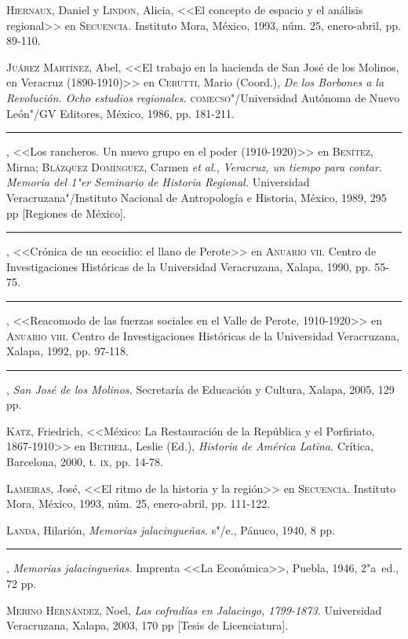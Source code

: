 \documentclass[14pt,twoside,final]{extbook} %
\begin{document}
\textsc{Hiernaux}, Daniel y \textsc{Lindon}, Alicia, <<El concepto de espacio y el análisis regional>> en \textsc{Secuencia}. Instituto Mora, México, 1993, núm. 25, enero-abril, pp. 89-110.

\textsc{Juárez Martínez}, Abel, <<El trabajo en la hacienda de San José de los Molinos, en Veracruz (1890-1910)>> en \textsc{Cerutti}, Mario (Coord.), \emph{De los Borbones a la
Revolución. Ocho estudios regionales.} \textsc{comecso}"/Universidad Autónoma de Nuevo León"/GV Editores, México, 1986, pp. 181-211.

\rule{1cm}{0.4pt}, <<Los rancheros. Un nuevo grupo en el poder (1910-1920)>> en \textsc{Benítez}, Mirna; \textsc{Blázquez Domínguez}, Carmen \emph{et al.}, \emph{Veracruz, un tiempo para contar. Memoria del 1"er Seminario de Historia Regional.} Universidad Veracruzana"/Instituto Nacional de Antropología e Historia, México, 1989, 295 pp [Regiones de México].

\rule{1cm}{0.4pt}, <<Crónica de un ecocidio: el llano de Perote>> en \textsc{Anuario vii}. Centro de Investigaciones Históricas de la Universidad Veracruzana, Xalapa, 1990, pp. 55-75.

\rule{1cm}{0.4pt}, <<Reacomodo de las fuerzas sociales en el Valle de Perote, 1910-1920>> en \textsc{Anuario viii}. Centro de Investigaciones Históricas de la Universidad Veracruzana, Xalapa, 1992, pp. 97-118.

\rule{1cm}{0.4pt}, \emph{San José de los Molinos.} Secretaría de Educación y Cultura, Xalapa, 2005, 129 pp.

\textsc{Katz}, Friedrich, <<México: La Restauración de la República y el Porfiriato, 1867-1910>> en \textsc{Bethell}, Leslie (Ed.), \emph{Historia de América Latina.} Crítica, Barcelona, 2000, t. \textsc{ix}, pp. 14-78.

\textsc{Lameiras}, José, <<El ritmo de la historia y la región>> en \textsc{Secuencia}. Instituto Mora, México, 1993, núm. 25, enero-abril, pp. 111-122.

\textsc{Landa}, Hilarión, \emph{Memorias jalacingueñas.} s"/e., Pánuco, 1940, 8 pp.

\rule{1cm}{0.4pt}, \emph{Memorias jalacingueñas.} Imprenta <<La Económica>>, Puebla, 1946, 2"a~ed., 72 pp.

\textsc{Merino Hernández}, Noel, \emph{Las cofradías en Jalacingo, 1799-1873.} Universidad Veracruzana, Xalapa, 2003, 170 pp [Tesis de Licenciatura].
\end{document}
